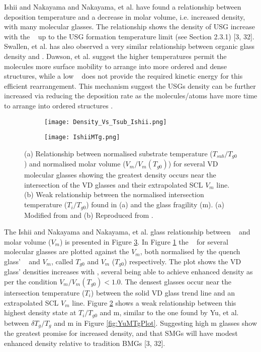 \documentclass[a4paper,12pt,oneside]{report}%
\begin{document}
Ishii and Nakayama \cite{Ishii2014} and Nakayama, et al. \cite{Nakayama2013} have found a relationship between deposition temperature and a decrease in molar volume, i.e. increased density, with many molecular glasses. The relationship shows the density of USG increase with the \Tsub~ up to the USG formation temperature limit (see Section 2.3.1) [3, 32]. Swallen, et al. \cite{Swallen2007} has also observed a very similar relationship between organic glass density and \Tsub. Dawson, et al. \cite{Dawson2010} suggest the higher temperatures permit the molecules more surface mobility to arrange into more ordered and dense structures, while a low \Tsub~ does not provide the required kinetic energy for this efficient rearrangement. This mechanism suggest the USGs density can be further increased via reducing the deposition rate as the molecules/atoms have more time to arrange into ordered structures \cite{Dawson2010}.

\begin{figure}[bp]
	\centering
	\begin{subfigure}[htbp]{0.75\textwidth}
		\texttt{[image: Density\_Vs\_Tsub\_Ishii.png]}
		\caption{}
		\label{fig:IshiiDensityTsub}
	\end{subfigure}
	\begin{subfigure}[htbp]{0.75\textwidth}
		\texttt{[image: IshiiMTg.png]}
		\caption{}
		\label{fig:IshiiMTg}
	\end{subfigure}
	\caption{(a) Relationship between normalised substrate temperature ($T_{sub}/T_{g0}$) and normalised molar volume ($V_{m}/V_{m} (T_{g0})$) for several VD molecular glasses showing the greatest density occurs near the intersection of the VD glasses and their extrapolated SCL $V_{m}$ line. (b) Weak relationship between the normalised intersection temperature ($T_{i}/T_{g0}$) found in (a) and the glass fragility (m). (a) Modified from \cite{Ishii2014} and (b) Reproduced from \cite{Ishii2014}.}%
	\label{fig:IshiiTsubM}
\end{figure}


The Ishii and Nakayama \cite{Ishii2014} and Nakayama, et al. \cite{Nakayama2013} glass relationship between \Tsub~ and molar volume ($V_{m}$) is presented in Figure \ref{fig:IshiiTsubM}. In Figure \ref{fig:IshiiDensityTsub} the \Tsub~ for several molecular glasses are plotted against the $V_{m}$, both normalised by the quench glass' \Tg~ and $V_{m}$, called $T_{g0}$ and $V_{m}$ ($T_{g0}$) respectively. The plot shows the VD glass' densities increases with \Tsub, several being able to achieve enhanced density as per the condition $V_{m}/V_{m} (T_{g0})<1.0$. The densest glasses occur near the intersection temperature ($T_{i}$) between the solid VD glass trend line and an extrapolated SCL $V_{m}$ line. Figure \ref{fig:IshiiMTg} shows a weak relationship between this highest density state at $T_{i}/T_{g0}$ and m, similar to the one found by Yu, et al. \cite{Yu2013} between $\delta T_{g}/T_{g}$ and m in Figure \ref{fig:YuMTgPlot}. Suggesting high m glasses show the greatest promise for increased density, and that SMGs will have modest enhanced density relative to tradition BMGs [3, 32].  
\end{document}
